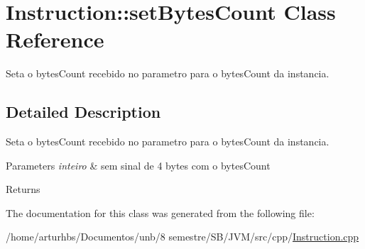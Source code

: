 \hypertarget{classInstruction_1_1setBytesCount}{}\section{Instruction\+:\+:set\+Bytes\+Count Class Reference}
\label{classInstruction_1_1setBytesCount}


Seta o bytes\+Count recebido no parametro para o bytes\+Count da instancia.  




\subsection{Detailed Description}
Seta o bytes\+Count recebido no parametro para o bytes\+Count da instancia. 


\begin{DoxyParams}{Parameters}
{\em inteiro} & sem sinal de 4 bytes com o bytes\+Count \\
\hline
\end{DoxyParams}
\begin{DoxyReturn}{Returns}

\end{DoxyReturn}


The documentation for this class was generated from the following file\+:\begin{DoxyCompactItemize}
\item 
/home/arturhbs/\+Documentos/unb/8 semestre/\+S\+B/\+J\+V\+M/src/cpp/\hyperlink{Instruction_8cpp}{Instruction.\+cpp}\end{DoxyCompactItemize}
